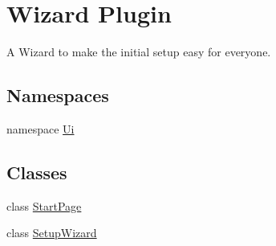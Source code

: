 \hypertarget{group___setup}{\section{Wizard Plugin}
\label{group___setup}
}


A Wizard to make the initial setup easy for everyone.  


\subsection*{Namespaces}
\begin{DoxyCompactItemize}
\item 
namespace \hyperlink{namespace_ui}{Ui}
\end{DoxyCompactItemize}
\subsection*{Classes}
\begin{DoxyCompactItemize}
\item 
class \hyperlink{class_start_page}{Start\-Page}
\item 
class \hyperlink{class_setup_wizard}{Setup\-Wizard}
\end{DoxyCompactItemize}
